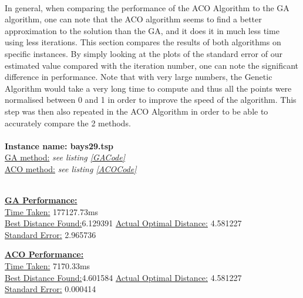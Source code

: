\documentclass[11pt,a4paper,final]{article}
\begin{document}
	\paragraph{ }In general, when comparing the performance of the ACO Algorithm to the GA algorithm, one can note that the ACO algorithm seems to find a better approximation to the solution than the GA, and it does it in much less time using less iterations. This section compares the results of both algorithms on specific instances. By simply looking at the plots of the standard error of our estimated value compared with the iteration number, one can note the significant difference in performance. Note that with very large numbers, the Genetic Algorithm would take a very long time to compute and thus all the points were normalised between 0 and 1 in order to improve the speed of the algorithm. This step was then also repeated in the ACO Algorithm in order to be able to accurately compare the 2 methods.\\
	\hspace{0pt}\\
	\textbf{Instance name: bays29.tsp}\\
	\underline{GA method:} \textit{see listing \ref{GACode}}\\
	\underline{ACO method:} \textit{see listing \ref{ACOCode}}\\
	\hspace{0pt}\\
	\begin{minipage}{0.475\textwidth}
		\textbf{\underline{GA Performance:}}\\
		\underline{Time Taken:} 177127.73ms\\
		\underline{Best Distance Found:}{\hspace{2pt}}6.129391
		\underline{Actual Optimal Distance:} 4.581227\\
		\underline{Standard Error:} 2.965736
	\end{minipage}
	\begin{minipage}{0.475\textwidth}
		\textbf{\underline{ACO Performance:}}\\
		\underline{Time Taken:} 7170.33ms\\
		\underline{Best Distance Found:}{\hspace{2pt}}4.601584
		\underline{Actual Optimal Distance:} 4.581227\\
		\underline{Standard Error:} 0.000414
	\end{minipage}	
	
\end{document}
